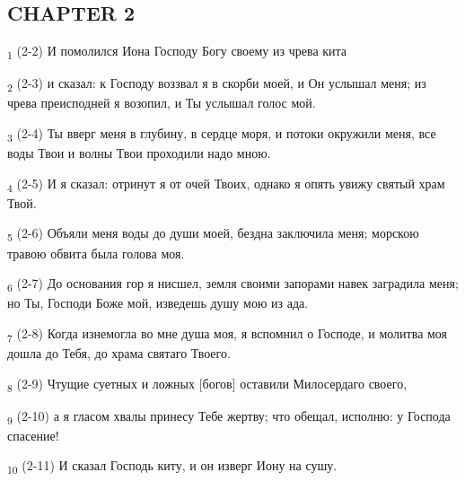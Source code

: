 \subsection{CHAPTER 2}
\begin{tcolorbox}
\textsubscript{1} (2-2) И помолился Иона Господу Богу своему из чрева кита
\end{tcolorbox}
\begin{tcolorbox}
\textsubscript{2} (2-3) и сказал: к Господу воззвал я в скорби моей, и Он услышал меня; из чрева преисподней я возопил, и Ты услышал голос мой.
\end{tcolorbox}
\begin{tcolorbox}
\textsubscript{3} (2-4) Ты вверг меня в глубину, в сердце моря, и потоки окружили меня, все воды Твои и волны Твои проходили надо мною.
\end{tcolorbox}
\begin{tcolorbox}
\textsubscript{4} (2-5) И я сказал: отринут я от очей Твоих, однако я опять увижу святый храм Твой.
\end{tcolorbox}
\begin{tcolorbox}
\textsubscript{5} (2-6) Объяли меня воды до души моей, бездна заключила меня; морскою травою обвита была голова моя.
\end{tcolorbox}
\begin{tcolorbox}
\textsubscript{6} (2-7) До основания гор я нисшел, земля своими запорами навек заградила меня; но Ты, Господи Боже мой, изведешь душу мою из ада.
\end{tcolorbox}
\begin{tcolorbox}
\textsubscript{7} (2-8) Когда изнемогла во мне душа моя, я вспомнил о Господе, и молитва моя дошла до Тебя, до храма святаго Твоего.
\end{tcolorbox}
\begin{tcolorbox}
\textsubscript{8} (2-9) Чтущие суетных и ложных [богов] оставили Милосердаго своего,
\end{tcolorbox}
\begin{tcolorbox}
\textsubscript{9} (2-10) а я гласом хвалы принесу Тебе жертву; что обещал, исполню: у Господа спасение!
\end{tcolorbox}
\begin{tcolorbox}
\textsubscript{10} (2-11) И сказал Господь киту, и он изверг Иону на сушу.
\end{tcolorbox}

